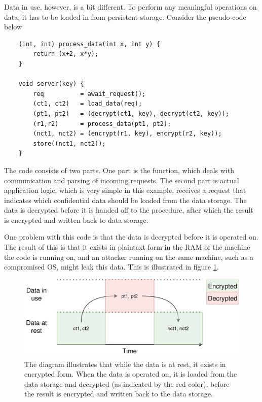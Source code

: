 Data in use, however, is a bit different. To perform any meaningful operations on data, it has to be loaded in from
persistent storage. Consider the pseudo-code below

\begin{verbatim}
    (int, int) process_data(int x, int y) {
        return (x+2, x*y);
    }

    void server(key) {
        req          = await_request();
        (ct1, ct2)   = load_data(req);
        (pt1, pt2)   = (decrypt(ct1, key), decrypt(ct2, key));
        (r1,r2)      = process_data(pt1, pt2);
        (nct1, nct2) = (encrypt(r1, key), encrypt(r2, key));
        store((nct1, nct2));
    }
\end{verbatim}

The code consists of two parts. One part is the  function, which deals with communication and parsing of
incoming requests. The second part is actual application logic, which is very simple in this example. 
receives a request that indicates which confidential data should be loaded from the data storage. The data is decrypted before
it is handed off to the  procedure, after which the result is encrypted and written back to data storage.

One problem with this code is that the data is decrypted before it is operated on. The result of this is that it exists in
plaintext form in the RAM of the machine the code is running on, and an attacker running on the same machine, such as a
compromised OS, might leak this data. This is illustrated
in figure \ref{graphics:unsafe-data-in-use}.

\begin{figure}
    \centering
    \includegraphics[scale=0.2]{graphics/unsafe-data-in-use.png}
    \caption{The diagram illustrates that while the data is at rest, it exists in encrypted form. When the data
    is operated on, it is loaded from the data storage and decrypted (as indicated by the red color), before the result is encrypted and
    written back to the data storage.}
    \label{graphics:unsafe-data-in-use}
\end{figure}

